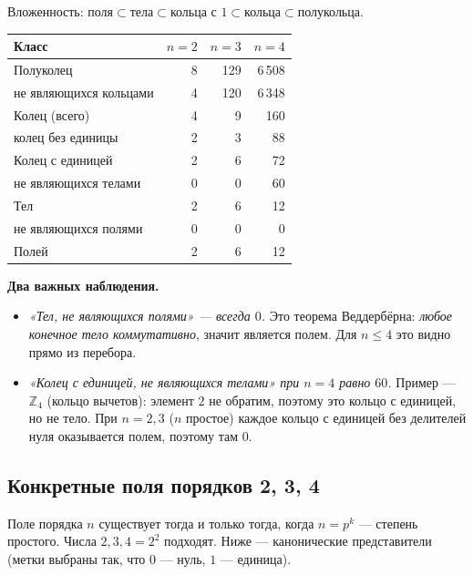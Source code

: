\documentclass[11pt]{article}
\begin{document}
Вложенность: $\text{поля}\subset\text{тела}\subset\text{кольца с 1}\subset\text{кольца}
\subset\text{полукольца}$.

\begin{idea}
\centering
\begin{tabular}{l r r r}
\toprule
\textbf{Класс} & $n=2$ & $n=3$ & $n=4$\\
\midrule
Полуколец                       & 8 & 129 & 6\,508\\
\quad не являющихся кольцами     & 4 & 120 & 6\,348\\
Колец (всего)                   & 4 & 9   & 160\\
\quad колец без единицы          & 2 & 3   & 88\\
Колец с единицей                & 2 & 6   & 72\\
\quad не являющихся телами        & 0 & 0   & 60\\
Тел                             & 2 & 6   & 12\\
\quad не являющихся полями        & 0 & 0   & 0\\
Полей                           & 2 & 6   & 12\\
\bottomrule
\end{tabular}
\end{idea}

\noindent\textbf{Два важных наблюдения.}
\begin{itemize}[leftmargin=1.4em]
  \item \emph{«Тел, не являющихся полями» — всегда $0$.} Это теорема Веддербёрна:
        \emph{любое конечное тело коммутативно}, значит является полем. Для $n\le 4$ это
        видно прямо из перебора.
  \item \emph{«Колец с единицей, не являющихся телами» при $n=4$ равно $60$.} Пример —
        $\mathbb{Z}_4$ (кольцо вычетов): элемент $2$ не обратим, поэтому это кольцо с
        единицей, но не тело. При $n=2,3$ ($n$ простое) каждое кольцо с единицей без
        делителей нуля оказывается полем, поэтому там $0$.
\end{itemize}

\subsection{Конкретные поля порядков 2, 3, 4}

Поле порядка $n$ существует тогда и только тогда, когда $n=p^{k}$ — степень простого.
Числа $2,3,4=2^2$ подходят. Ниже — канонические представители (метки выбраны так, что
$0$ — нуль, $1$ — единица).
\end{document}
